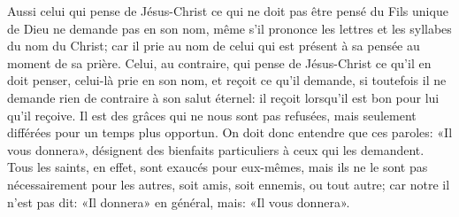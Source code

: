 Aussi celui qui pense de Jésus-Christ
		ce qui ne doit pas être pensé du Fils unique de Dieu
	ne demande pas en son nom,
	même s’il prononce les lettres et les syllabes du nom du Christ;
	car il prie
		au nom de celui qui est présent à sa pensée au moment de sa prière.
Celui, au contraire, qui pense de Jésus-Christ ce qu’il en doit penser,
	celui-là prie en son nom, et reçoit ce qu’il demande,
	si toutefois il ne demande rien de contraire à son salut éternel:
	il reçoit lorsqu’il est bon pour lui qu’il reçoive.
Il est des grâces qui ne nous sont pas refusées,
	mais seulement différées pour un temps plus opportun.
On doit donc entendre que ces paroles: «Il vous donnera»,
	désignent des bienfaits particuliers à ceux qui les demandent.
Tous les saints, en effet, sont exaucés pour eux-mêmes,
	mais ils ne le sont pas nécessairement pour les autres,
	soit amis, soit ennemis, ou tout autre;
	car notre il n’est pas dit: «Il donnera» en général,
	mais: «Il vous donnera».
